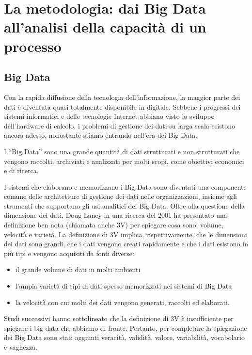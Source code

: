 \chapter{La metodologia: dai Big Data all'analisi della capacità di un processo}
\label{chap:Big Data e l'analisi della capacità di un processo}

\section{Big Data}

Con la rapida diffusione della tecnologia dell'informazione, la maggior parte dei dati è diventata quasi totalmente disponibile in digitale. 
Sebbene i progressi dei sistemi informatici e delle tecnologie Internet abbiano visto lo sviluppo dell'hardware di calcolo, i problemi di gestione dei dati su larga scala esistono ancora adesso, nonostante stiamo entrando nell'era dei Big Data.  
\cite{tsai2015big}


I ``Big Data'' sono una grande quantità di dati strutturati e non strutturati che vengono raccolti, archiviati e analizzati per molti scopi, come obiettivi economici e di ricerca.  
\cite{techtarget}


I sistemi che elaborano e memorizzano i Big Data sono diventati una componente comune delle architetture di gestione dei dati nelle organizzazioni, insieme agli strumenti che supportano gli usi analitici dei Big Data. 
Oltre alla questione della dimensione dei dati, Doug  Lancy in una ricerca del 2001 ha presentato una definizione ben nota (chiamata anche 3V) per spiegare cosa sono: volume, velocità e varietà. 
La definizione di 3V implica, rispettivamente, che le dimensioni dei dati sono grandi, che i dati vengono creati rapidamente e che i dati esistono in più tipi e vengono acquisiti da fonti diverse:

\begin{itemize}
    \item il grande volume di dati in molti ambienti
    \item l'ampia varietà di tipi di dati spesso memorizzati nei sistemi di Big Data
    \item la velocità con cui molti dei dati vengono generati, raccolti ed elaborati.
\end{itemize}

Studi successivi hanno sottolineato che la definizione di 3V è insufficiente per spiegare i big data che abbiamo di fronte. Pertanto, per completare la spiegazione dei Big Data sono stati aggiunti veracità, validità, valore, variabilità, vocabolario e vaghezza. 
\cite{tsai2015big}


